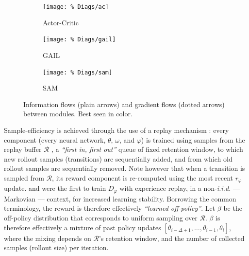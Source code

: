 \begin{figure}
\centering
\begin{subfigure}[t]{0.27\textwidth}
\centering
\texttt{[image: \%
Diags/ac]}
\caption{Actor-Critic \cite{Sutton1999-ii}}
\end{subfigure}
\begin{subfigure}[t]{0.27\textwidth}
\centering
\texttt{[image: \%
Diags/gail]}
\caption{GAIL \cite{Ho2016-bv}}
\end{subfigure}
\begin{subfigure}[t]{0.37\textwidth}
\centering
\texttt{[image: \%
Diags/sam]}
\caption{SAM \cite{Blonde2019-vc}}
\end{subfigure}
\caption{Information flows (plain arrows)
and gradient flows (dotted arrows) between modules.
Best seen in color.}
\label{infogradflow}
\end{figure}

Sample-efficiency is achieved through the use of a replay mechanism \cite{Lin1992-pp}:
every component (every neural network, $\theta$, $\omega$, and $\varphi$)
is trained using samples from the replay buffer $\mathcal{R}$ \cite{Mnih2013-rb,Mnih2015-iy},
a \textit{``first in, first out''} queue of fixed retention window,
to which new rollout samples (transitions) are sequentially added,
and from which old rollout samples are sequentially removed.
Note however that when a transition is sampled from $\mathcal{R}$,
its reward component is re-computed using the most recent $r_\varphi$ update.
\cite{Blonde2019-vc} and \cite{Kostrikov2019-jo} were the first to train $D_\varphi$
with experience replay, in a non-\textit{i.i.d.} --- Markovian --- context,
for increased learning stability.
Borrowing the common terminology,
the reward is therefore effectively \textit{``learned off-policy''}.
Let $\beta$ be the off-policy distribution that corresponds to uniform sampling
over $\mathcal{R}$. $\beta$ is therefore effectively a mixture of past policy updates
$[\theta_{i - \Delta + 1}, \ldots, \theta_{i - 1}, \theta_i]$,
where the mixing depends on $\mathcal{R}$'s retention window, and the number of collected
samples (rollout size) per iteration.

